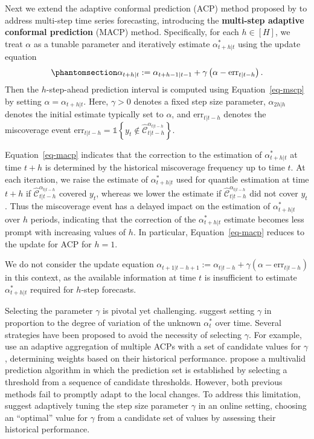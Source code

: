 \documentclass[
  11pt,
  a4paper,
]{article}
\theoremstyle{plain}
\theoremstyle{remark}
\begin{document}
Next we extend the adaptive conformal prediction (ACP) method proposed
by \textcite{gibbs2021} to address multi-step time series forecasting,
introducing the \textbf{multi-step adaptive conformal prediction} (MACP)
method. Specifically, for each \(h \in [H]\), we treat \(\alpha\) as a
tunable parameter and iteratively estimate \(\alpha_{t+h|t}^{*}\) using
the update
equation
\begin{equation}\phantomsection\label{eq-macp}{
\alpha_{t+h|t} := \alpha_{t+h-1|t-1} + \gamma\left(\alpha - \mathrm{err}_{t|t-h}\right).
}\end{equation} Then the \(h\)-step-ahead prediction interval is
computed using Equation~\ref{eq-mscp} by setting
\(\alpha = \alpha_{t+h|t}\). Here, \(\gamma > 0\) denotes a fixed step
size parameter, \(\alpha_{2h|h}\) denotes the initial estimate typically
set to \(\alpha\), and \(\mathrm{err}_{t|t-h}\) denotes the miscoverage
event
\(\mathrm{err}_{t|t-h} = \mathbb{1}\left\{y_t \notin \hat{\mathcal{C}}_{t|t-h}^{\alpha_{t|t-h}}\right\}\).

Equation~\ref{eq-macp} indicates that the correction to the estimation
of \(\alpha_{t+h|t}^{*}\) at time \(t+h\) is determined by the
historical miscoverage frequency up to time \(t\). At each iteration, we
raise the estimate of \(\alpha_{t+h|t}^{*}\) used for quantile
estimation at time \(t+h\) if
\(\hat{\mathcal{C}}_{t|t-h}^{\alpha_{t|t-h}}\) covered \(y_t\), whereas
we lower the estimate if \(\hat{\mathcal{C}}_{t|t-h}^{\alpha_{t|t-h}}\)
did not cover \(y_t\). Thus the miscoverage event has a delayed impact
on the estimation of \(\alpha_{t+h|t}^{*}\) over \(h\) periods,
indicating that the correction of the \(\alpha_{t+h|t}^{*}\) estimate
becomes less prompt with increasing values of \(h\). In particular,
Equation~\ref{eq-macp} reduces to the update for ACP for \(h=1\).

We do not consider the update equation
\(\alpha_{t+1|t-h+1} := \alpha_{t|t-h} + \gamma\left(\alpha - \mathrm{err}_{t|t-h}\right)\)
in this context, as the available information at time \(t\) is
insufficient to estimate \(\alpha_{t+h|t}^{*}\) required for \(h\)-step
forecasts.

Selecting the parameter \(\gamma\) is pivotal yet challenging.
\textcite{gibbs2021} suggest setting \(\gamma\) in proportion to the
degree of variation of the unknown \(\alpha_{t}^{*}\) over time. Several
strategies have been proposed to avoid the necessity of selecting
\(\gamma\). For example, \textcite{zaffran2022} use an adaptive
aggregation of multiple ACPs with a set of candidate values for
\(\gamma\) , determining weights based on their historical performance.
\textcite{bastani2022} propose a multivalid prediction algorithm in
which the prediction set is established by selecting a threshold from a
sequence of candidate thresholds. However, both previous methods fail to
promptly adapt to the local changes. To address this limitation,
\textcite{gibbs2024} suggest adaptively tuning the step size parameter
\(\gamma\) in an online setting, choosing an ``optimal'' value for
\(\gamma\) from a candidate set of values by assessing their historical
performance.
\end{document}
